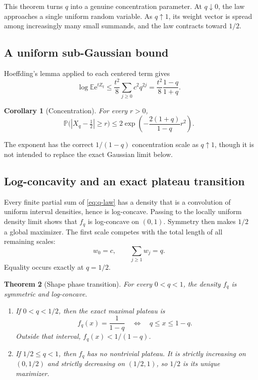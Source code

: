 \documentclass[11pt,oneside]{article}
\newtheorem{theorem}{Theorem}[section]
\newtheorem{corollary}[theorem]{Corollary}
\theoremstyle{definition}
\theoremstyle{remark}
\newcommand{\E}{\mathbb E}
\newcommand{\Prob}{\mathbb P}
\newcommand{\e}{\mathrm e}
\begin{document}
This theorem turns $q$ into a genuine concentration parameter.  At $q\downarrow0$, the law
approaches a single uniform random variable.  As $q\uparrow1$, its weight vector is spread
among increasingly many small summands, and the law contracts toward $1/2$.

\subsection{A uniform sub-Gaussian bound}

Hoeffding's lemma applied to each centered term gives
\[
 \log\E\e^{tZ_q}
 \le\frac{t^2}{8}\sum_{j\ge0}c^2q^{2j}
 =\frac{t^2}{8}\frac{1-q}{1+q}.
\]

\begin{corollary}[Concentration]
\label{cor:concentration}
For every $r>0$,
\begin{equation}
 \Prob\bigl(|X_q-\tfrac12|\ge r\bigr)
 \le2\exp\!\left(-\frac{2(1+q)}{1-q}r^2\right).             \label{eq:hoeffding}
\end{equation}
\end{corollary}

The exponent has the correct $1/(1-q)$ concentration scale as $q\uparrow1$, though it is not
intended to replace the exact Gaussian limit below.

\subsection{Log-concavity and an exact plateau transition}

Every finite partial sum of \eqref{eq:q-law} has a density that is a convolution of uniform
interval densities, hence is log-concave.  Passing to the locally uniform density limit shows
that $f_q$ is log-concave on $(0,1)$.  Symmetry then makes $1/2$ a global maximizer.
The first scale competes with the total length of all remaining scales:
\[
 w_0=c,
 \qquad
 \sum_{j\ge1}w_j=q.
\]
Equality occurs exactly at $q=1/2$.

\begin{theorem}[Shape phase transition]
\label{thm:plateau}
For every $0<q<1$, the density $f_q$ is symmetric and log-concave.

\begin{enumerate}[label=\textup{(\roman*)}]
\item If $0<q<1/2$, then the exact maximal plateau is
\begin{equation}
 f_q(x)=\frac{1}{1-q}
 \quad\Longleftrightarrow\quad q\le x\le1-q.                 \label{eq:plateau}
\end{equation}
Outside that interval, $f_q(x)<1/(1-q)$.
\item If $1/2\le q<1$, then $f_q$ has no nontrivial plateau.  It is strictly increasing on
$(0,1/2)$ and strictly decreasing on $(1/2,1)$, so $1/2$ is its unique maximizer.
\end{enumerate}
\end{theorem}
\end{document}
